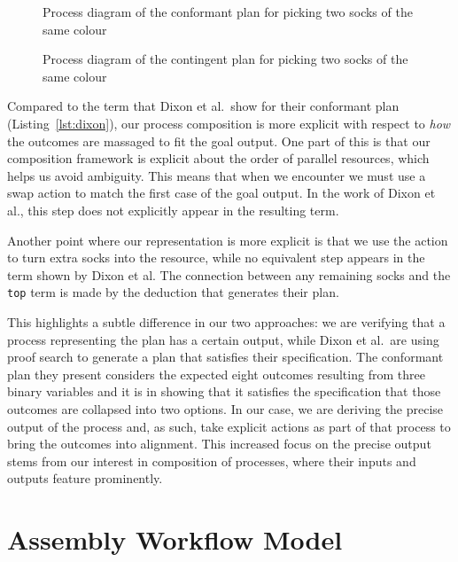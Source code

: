 \documentclass[class=smolathesis,crop=false]{standalone}
\begin{document}
\begin{figure}
  \centering
  
  \caption{Process diagram of the conformant plan for picking two socks of the same colour}
  \label{fig:threeSocks-conformant}
\end{figure}
\begin{figure}
  \centering
  
  \caption{Process diagram of the contingent plan for picking two socks of the same colour}
  \label{fig:threeSocks-contingent}
\end{figure}

Compared to the term that Dixon et al.\ show for their conformant plan (Listing~\ref{lst:dixon}), our process composition is more explicit with respect to \emph{how} the outcomes are massaged to fit the goal output.
One part of this is that our composition framework is explicit about the order of parallel resources, which helps us avoid ambiguity.
This means that when we encounter  we must use a swap action to match the first case of the goal output.
In the work of Dixon et al., this step does not explicitly appear in the resulting term.

Another point where our representation is more explicit is that we use the  action to turn extra socks into the  resource, while no equivalent step appears in the term shown by Dixon et al.
The connection between any remaining socks and the \texttt{top} term is made by the deduction that generates their plan.

This highlights a subtle difference in our two approaches: we are verifying that a process representing the plan has a certain output, while Dixon et al.\ are using proof search to generate a plan that satisfies their specification.
The conformant plan they present considers the expected eight outcomes resulting from three binary variables and it is in showing that it satisfies the specification that those outcomes are collapsed into two options.
In our case, we are deriving the precise output of the process and, as such, take explicit actions as part of that process to bring the outcomes into alignment.
This increased focus on the precise output stems from our interest in composition of processes, where their inputs and outputs feature prominently.

\section{Assembly Workflow Model}
\label{sec:cases/assembly}
\end{document}
